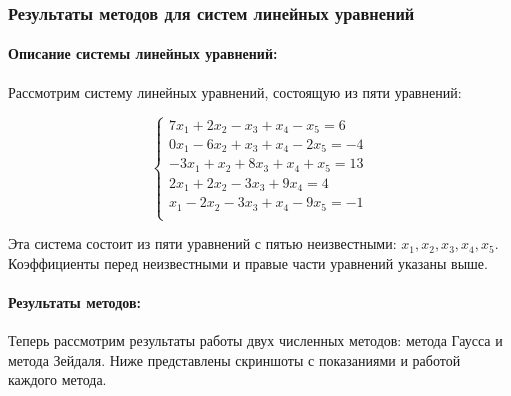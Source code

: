 \documentclass[12pt]{article}
\begin{document}
    \subsubsection{Результаты методов для систем линейных уравнений}

    \paragraph{Описание системы линейных уравнений:}

    Рассмотрим систему линейных уравнений, состоящую из пяти уравнений:

    \begin{center}
        \[
            \begin{cases}
                7x_1 + 2x_2 - x_3 + x_4 - x_5 = 6 \\
                0x_1 - 6x_2 + x_3 + x_4 - 2x_5 = -4 \\
                -3x_1 + x_2 + 8x_3 + x_4 + x_5 = 13 \\
                2x_1 + 2x_2 - 3x_3 + 9x_4 = 4 \\
                x_1 - 2x_2 - 3x_3 + x_4 - 9x_5 = -1 \\
            \end{cases}
        \]
    \end{center}

    Эта система состоит из пяти уравнений с пятью неизвестными: $x_1, x_2, x_3, x_4, x_5$. Коэффициенты перед неизвестными и правые части уравнений указаны выше.

    \paragraph{Результаты методов:}

    Теперь рассмотрим результаты работы двух численных методов: метода Гаусса и метода Зейдаля. Ниже представлены скриншоты с показаниями и работой каждого метода.
\end{document}
